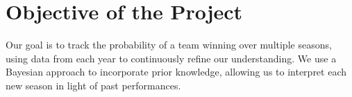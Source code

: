 \section{Objective of the Project}

Our goal is to track the probability of a team winning over multiple seasons, using data from each year to continuously refine our understanding.
We use a Bayesian approach to incorporate prior knowledge, allowing us to interpret each new season in light of past performances.
